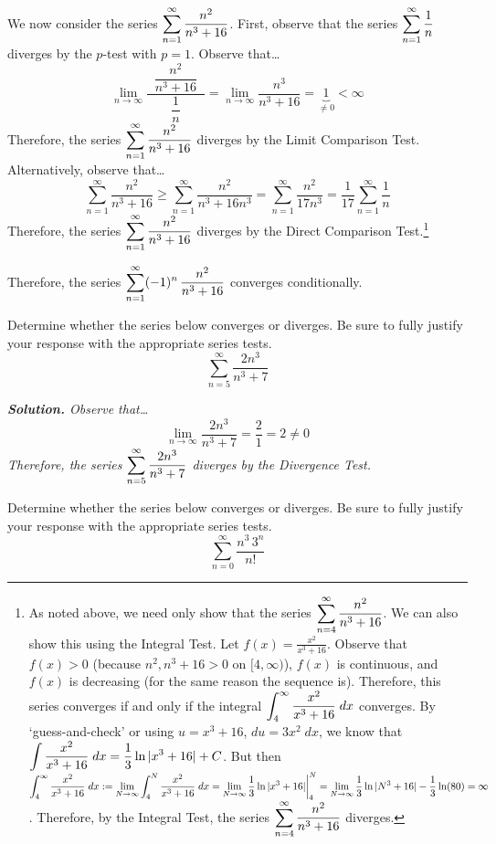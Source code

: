 \documentclass[12pt,letterpaper]{exam}
\begin{document}
\begin{questions}
{We now consider the series $\displaystyle\sum_{n=1}^\infty \dfrac{n^2}{n^3 + 16}$. First, observe that the series $\displaystyle\sum_{n=1}^\infty \dfrac{1}{n}$ diverges by the $p$-test with $p= 1$. Observe that\dots
	\[
	\lim_{n \to \infty} \dfrac{\;\;\dfrac{n^2}{n^3 + 16}\;\;}{\dfrac{1}{n}}= \lim_{n \to \infty} \dfrac{n^3}{n^3 + 16}= \underbrace{1}_{\neq 0} < \infty
	\]
Therefore, the series $\displaystyle\sum_{n=1}^\infty \dfrac{n^2}{n^3 + 16}$ diverges by the Limit Comparison Test. Alternatively, observe that\dots
	\[
	\sum_{n=1}^\infty \dfrac{n^2}{n^3 + 16} \geq \sum_{n=1}^\infty \dfrac{n^2}{n^3 + 16n^3}= \sum_{n=1}^\infty \dfrac{n^2}{17n^3}= \dfrac{1}{17} \sum_{n=1}^\infty \dfrac{1}{n}
	\]
Therefore, the series $\displaystyle\sum_{n=1}^\infty \dfrac{n^2}{n^3 + 16}$ diverges by the Direct Comparison Test.\footnote{\tiny As noted above, we need only show that the series $\displaystyle\sum_{n=4}^\infty \frac{n^2}{n^3 + 16}$. We can also show this using the Integral Test. Let $f(x)= \frac{x^2}{x^3 + 16}$. Observe that $f(x) > 0$ (because $n^2, n^3 + 16 > 0$ on $[4, \infty)$), $f(x)$ is continuous, and $f(x)$ is decreasing (for the same reason the sequence is). Therefore, this series converges if and only if the integral $\displaystyle\int_4^\infty \frac{x^2}{x^3 + 16} \;dx$ converges. By `guess-and-check' or using $u= x^3 + 16$, $du= 3x^2 \;dx$, we know that $\displaystyle\int \frac{x^2}{x^3 + 16} \;dx= \frac{1}{3} \ln|x^3 + 16| + C$. But then $\displaystyle\int_4^\infty \frac{x^2}{x^3 + 16} \;dx:= \lim_{N \to \infty} \int_4^N \frac{x^2}{x^3 + 16} \;dx= \lim_{N \to \infty} \frac{1}{3} \ln|x^3 + 16| \bigg|_4^N= \lim_{N \to \infty} \frac{1}{3} \ln|N^3 + 16| - \frac{1}{3} \ln(80)= \infty$. Therefore, by the Integral Test, the series $\displaystyle\sum_{n=4}^\infty \frac{n^2}{n^3 + 16}$ diverges.} \pspace

Therefore, the series $\displaystyle\sum_{n=1}^\infty (-1)^n \, \dfrac{n^2}{n^3 + 16}$ converges conditionally.}



\newpage
\question[10] Determine whether the series below converges or diverges. Be sure to fully justify your response with the appropriate series tests.
	\[
	\sum_{n=5}^\infty \dfrac{2n^3}{n^3 + 7} 
	\] \pspace

{\itshape \textbf{Solution.} Observe that\dots
	\[
	\lim_{n \to \infty} \dfrac{2n^3}{n^3 + 7}= \dfrac{2}{1}= 2 \neq 0
	\] \pspace
Therefore, the series $\displaystyle\sum_{n=5}^\infty \dfrac{2n^3}{n^3 + 7}$ diverges by the Divergence Test.}



\newpage
\question[10] Determine whether the series below converges or diverges. Be sure to fully justify your response with the appropriate series tests.
	\[
	\sum_{n=0}^\infty \dfrac{n^3 \, 3^n}{n!}
	\] \pspace


\end{questions}
\end{document}
